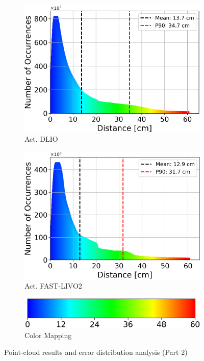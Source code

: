 \documentclass[english, bachelor, utf8]{base/thesis_telematics}
\begin{document}
\begin{figure}
\begin{subfigure}{0.4\textwidth}
    \centering
    \includegraphics[width=\textwidth]{pics/histogram_results/histogram_cond_actuated_dlio.png}
    \caption{Act. DLIO}
    \label{fig:hist_act_dlio}
\end{subfigure}
\begin{subfigure}{0.4\textwidth}
    \centering
    \includegraphics[width=\textwidth]{pics/histogram_results/histogram_cond_actuated_livo.png}
    \caption{Act. FAST-LIVO2}
    \label{fig:hist_act_livo}
\end{subfigure}
\begin{subfigure}{0.3\textwidth}
    \centering
    \includegraphics[width=\textwidth]{pics/histogram_results/hsv.png}
    \caption{Color Mapping}
    \label{fig:hsv}
\end{subfigure}
\vspace{2mm}
    \caption{Point-cloud results and error distribution analysis (Part 2)}
    \label{fig:combined_results2}
\end{figure}
\end{document}
